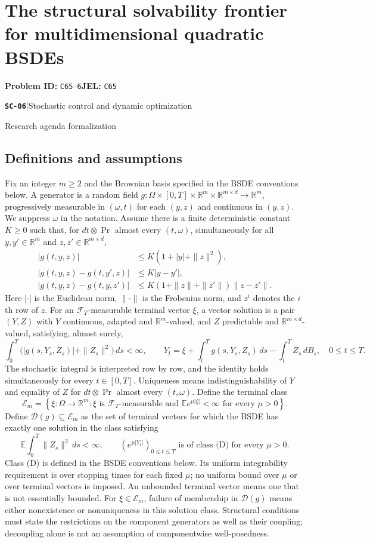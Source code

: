 \documentclass[11pt,a4paper]{article}
\newcommand{\R}{\mathbb R}
\newcommand{\E}{\mathbb E}
\newcommand{\entrymeta}[3]{{\sffamily\small\color{muted}\textbf{\texttt{#1}}\quad|\quad #2\par #3\par}}
\begin{document}
\section*{The structural solvability frontier for multidimensional quadratic BSDEs}
\textbf{Problem ID:} \texttt{C65-6}\quad \textbf{JEL:} \texttt{C65}\par
\label{problem:OP-0567}
\label{beyond:SC-06}
\entrymeta{SC-06}{Stochastic control and dynamic optimization}{Research agenda formalization}
\subsection*{Definitions and assumptions}
Fix an integer $m\geq2$ and the Brownian basis specified in the
BSDE conventions below. A generator is a random field
$g:\Omega\times[0,T]\times\R^m\times\R^{m\times d}\to\R^m$,
progressively measurable in $(\omega,t)$ for each $(y,z)$ and
continuous in $(y,z)$. We suppress $\omega$ in the notation.
Assume there is a finite deterministic constant $K\geq0$ such that,
for $dt\otimes\Pr$ almost every $(t,\omega)$, simultaneously for all
$y,y'\in\R^m$ and $z,z'\in\R^{m\times d}$,
\begin{align*}
 |g(t,y,z)|&\leq K(1+|y|+\|z\|^2),\\
 |g(t,y,z)-g(t,y',z)|&\leq K|y-y'|,\\
 |g(t,y,z)-g(t,y,z')|&\leq
 K(1+\|z\|+\|z'\|)\|z-z'\|.
\end{align*}
Here $|\cdot|$ is the Euclidean norm, $\|\cdot\|$ is the Frobenius
norm, and $z^i$ denotes the $i$th row of $z$. For an
$\mathcal F_T$-measurable terminal vector $\xi$, a vector solution is a
pair $(Y,Z)$ with $Y$ continuous, adapted and $\R^m$-valued, and $Z$
predictable and $\R^{m\times d}$-valued, satisfying, almost surely,
\[
 \int_0^T\bigl(|g(s,Y_s,Z_s)|+\|Z_s\|^2\bigr)\,ds<\infty,
 \qquad
 Y_t=\xi+\int_t^T g(s,Y_s,Z_s)\,ds-\int_t^T Z_s\,dB_s,
 \quad 0\leq t\leq T.
\]
The stochastic integral is interpreted row by row, and the identity holds
simultaneously for every $t\in[0,T]$. Uniqueness means indistinguishability
of $Y$ and equality of $Z$ for $dt\otimes\Pr$ almost every $(t,\omega)$.
Define the terminal class
\[
 \mathcal E_m=\left\{\xi:\Omega\to\R^m:
 \xi\text{ is }\mathcal F_T\text{-measurable and }
 \E e^{\mu|\xi|}<\infty\text{ for every }\mu>0\right\}.
\]
Define $\mathcal D(g)\subseteq\mathcal E_m$ as the set of terminal vectors
for which the BSDE has exactly one solution in the class satisfying
\[
 \E\int_0^T\|Z_s\|^2\,ds<\infty,
 \qquad
 (e^{\mu|Y_t|})_{0\leq t\leq T}\text{ is of class (D) for every }\mu>0.
\]
Class (D) is defined in the BSDE conventions below. Its uniform
integrability requirement is over stopping times for each fixed $\mu$;
no uniform bound over $\mu$ or over terminal vectors is imposed.
An unbounded terminal vector means one that is not essentially bounded.
For $\xi\in\mathcal E_m$, failure of membership in $\mathcal D(g)$
means either nonexistence or nonuniqueness in this solution class.
Structural conditions must state the restrictions on the component
generators as well as their coupling; decoupling alone is not an
assumption of componentwise well-posedness.
\end{document}
